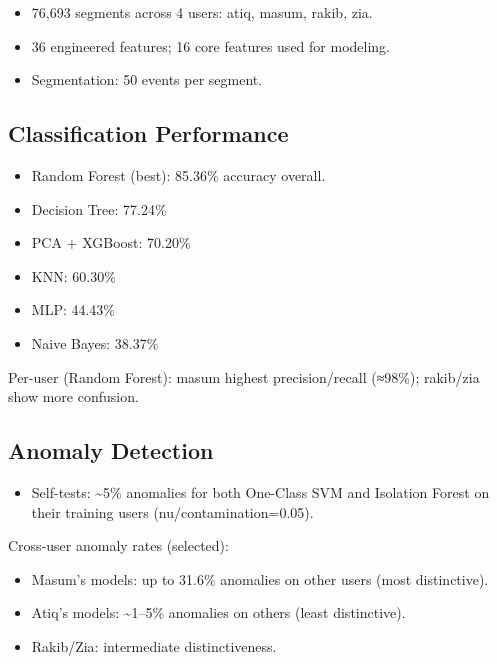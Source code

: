 \documentclass[
  11pt,
  a4paper,
]{article}
\providecommand{\tightlist}{%
  \setlength{\itemsep}{0pt}\setlength{\parskip}{0pt}}
\begin{document}
\begin{itemize}
\tightlist
\item
  76,693 segments across 4 users: atiq, masum, rakib, zia.
\item
  36 engineered features; 16 core features used for modeling.
\item
  Segmentation: 50 events per segment.
\end{itemize}

\subsection{Classification
Performance}\label{classification-performance}

\begin{itemize}
\tightlist
\item
  Random Forest (best): 85.36\% accuracy overall.
\item
  Decision Tree: 77.24\%
\item
  PCA + XGBoost: 70.20\%
\item
  KNN: 60.30\%
\item
  MLP: 44.43\%
\item
  Naive Bayes: 38.37\%
\end{itemize}

Per-user (Random Forest): masum highest precision/recall (≈98\%);
rakib/zia show more confusion.

\subsection{Anomaly Detection}\label{anomaly-detection-1}

\begin{itemize}
\tightlist
\item
  Self-tests: \textasciitilde5\% anomalies for both One-Class SVM and
  Isolation Forest on their training users (nu/contamination=0.05).
\end{itemize}

Cross-user anomaly rates (selected):

\begin{itemize}
\tightlist
\item
  Masum's models: up to 31.6\% anomalies on other users (most
  distinctive).
\item
  Atiq's models: \textasciitilde1--5\% anomalies on others (least
  distinctive).
\item
  Rakib/Zia: intermediate distinctiveness.
\end{itemize}
\end{document}
